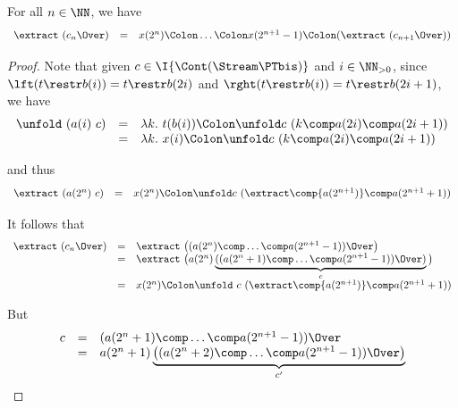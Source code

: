 \begin{lemma}
\label{lem:proof:sem:stream-tree}
For all $n \in \NN$, we have
\[
\begin{array}{r c l}
  \extract\ (c_n \Over)
& =
& x(2^n) \Colon \ldots \Colon x(2^{n+1}-1) \Colon
  (\extract\ (c_{n+1} \Over))
\end{array}
\]
\end{lemma}

\begin{proof}
Note that given $c \in \I{\Cont(\Stream\PTbis)}$
and $i \in \NN_{>0}$,
since
$\lft(t \restr b(i)) = t \restr b(2i)$
and
$\rght(t \restr b(i)) = t \restr b(2i+1)$,
we have
\[
\begin{array}{r c l}
  \unfold\ (a(i)\ c)
& =
& \lambda k.~
  t(b(i)) \Colon
  \unfold c\ (k \comp a(2i) \comp a(2i+1))
\\
& =
& \lambda k.~
  x(i) \Colon
  \unfold c\ (k \comp a(2i) \comp a(2i+1))
\end{array}
\]

\noindent
and thus
\[
\begin{array}{r c l}
  \extract\ (a(2^n)\ c)
& =
& x(2^n) \Colon
  \unfold c\ ({\extract} \comp {a(2^{n+1})} \comp a(2^{n+1}+1))
\end{array}
\]

\noindent
It follows that
\[
\begin{array}{l l l}
  \extract\ (c_n \Over)
& =
& \extract\ \big( (a(2^n) \comp \dots \comp a(2^{n+1}-1)) \Over \big)
\\
%
& =
& \extract\
  \big( a(2^n) \underbrace{((a(2^n+1) \comp \dots \comp a(2^{n+1}-1)) \Over)}_c \big)
\\
%
& =
& x(2^n) \Colon
  \unfold\ c\ ({\extract} \comp {a(2^{n+1})} \comp a(2^{n+1}+1))
\end{array}
\]

\noindent
But
\[
\begin{array}{l l l}
  c
& =
& (a(2^n+1) \comp \dots \comp a(2^{n+1}-1)) \Over
\\
%
& =
& a(2^n+1)
  \underbrace{\big( (a(2^n+2) \comp \dots \comp a(2^{n+1}-1)) \Over \big)}_{c'}
\end{array}
\]


\end{proof}
